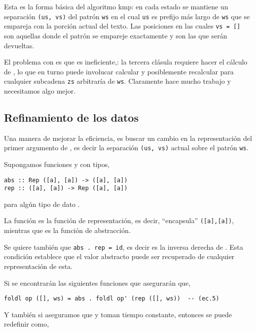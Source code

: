 Esta es la forma básica del algoritmo kmp: en cada estado se mantiene un separación \texttt{(us, vs)}
del patrón \texttt{ws} en el cual \texttt{us} es prefijo más largo de \texttt{ws} que se empareja
con la porción actual del texto. Las posiciones en las cuales \texttt{vs = []} son aquellas donde el patrón
se empareje exactamente y son las que serán devueltas.

El problema con  es que es ineficiente,: la tercera clásula requiere hacer el cálculo de
, lo que en turno puede involucar calcular y posiblemente recalcular
 para cualquier subcadena \texttt{zs} arbitraría de \texttt{ws}. Claramente
 hace mucho trabajo y necesitamos algo mejor. 

\subsection{Refinamiento de los datos}

Una manera de mejorar la eficiencia, es buscar un cambio en la representación del primer argumento 
de , es decir la separación \texttt{(us, vs)} actual sobre el patrón \texttt{ws}.

Supongamos funciones  y  con tipos,

\begin{verbatim}
abs :: Rep ([a], [a]) -> ([a], [a])
rep :: ([a], [a]) -> Rep ([a], [a])
\end{verbatim}

para algún tipo de dato .

La función  es la función de representación, es decir, ``encapsula'' \texttt{([a],[a])},
mientras que  es la función de abstracción. %

Se quiere también que \texttt{abs . rep = id}, es decir  es la inversa derecha de
. Esta condición establece que el valor abstracto puede ser recuperado de cualquier
representación de esta.

Si se encontrarán las siguientes funciones que asegurarán que, %
\begin{verbatim}
foldl op ([], ws) = abs . foldl op' (rep ([], ws))  -- (ec.5)
\end{verbatim}

Y también si aseguramos que  y  toman tiempo constante, entonces se puede
redefinir  como,

